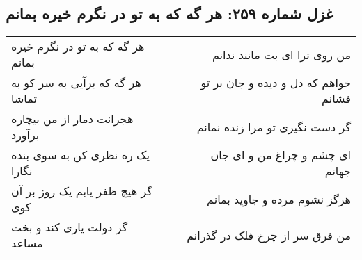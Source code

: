 \begin{center}
\section*{غزل شماره ۲۵۹: هر گه که به تو در نگرم خیره بمانم}
\label{sec:259}
\begin{longtable}{l p{0.5cm} r}
هر گه که به تو در نگرم خیره بمانم
&&
من روی ترا ای بت مانند ندانم
\\
هر گه که برآیی به سر کو به تماشا
&&
خواهم که دل و دیده و جان بر تو فشانم
\\
هجرانت دمار از من بیچاره برآورد
&&
گر دست نگیری تو مرا زنده نمانم
\\
یک ره نظری کن به سوی بنده نگارا
&&
ای چشم و چراغ من و ای جان جهانم
\\
گر هیچ ظفر یابم یک روز بر آن کوی
&&
هرگز نشوم مرده و جاوید بمانم
\\
گر دولت یاری کند و بخت مساعد
&&
من فرق سر از چرخ فلک در گذرانم
\\
\end{longtable}
\end{center}
